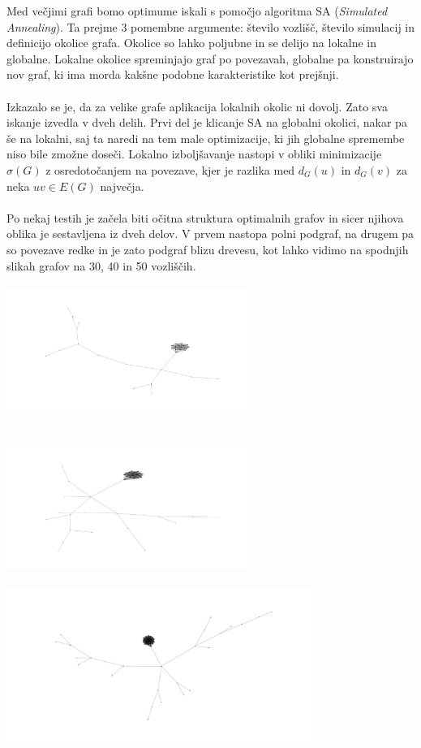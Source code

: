 \documentclass[ letterpaper, titlepage, fleqn]{article}
\begin{document}
Med večjimi grafi bomo optimume iskali s pomočjo algoritma SA ({\em Simulated Annealing}). 
Ta prejme 3 pomembne argumente: število vozlišč, število simulacij in definicijo okolice grafa.
Okolice so lahko poljubne in se delijo na lokalne in globalne.
Lokalne okolice spreminjajo graf po povezavah, globalne pa
konstruirajo nov graf, ki ima morda kakšne podobne karakteristike kot prejšnji.
\\\\
Izkazalo se je, da za velike grafe aplikacija lokalnih okolic ni dovolj. Zato
sva iskanje izvedla v dveh delih. Prvi del je klicanje SA na globalni okolici, nakar
pa še na lokalni, saj ta naredi na tem male optimizacije, ki jih globalne spremembe 
niso bile zmožne doseči.
Lokalno izboljšavanje nastopi v obliki minimizacije $\sigma(G)$ z osredotočanjem na
povezave, kjer je razlika med $d_G(u)$ in $d_G(v)$ za neka $uv \in E(G)$ največja.
\\\\
Po nekaj testih je začela biti očitna struktura optimalnih grafov in sicer
njihova oblika je sestavljena iz dveh delov. V prvem nastopa polni podgraf, 
na drugem pa so povezave redke in je zato podgraf blizu drevesu, kot lahko 
vidimo na spodnjih slikah grafov na 30, 40 in 50 vozliščih. \\
\includegraphics[width=8cm, height=5cm]{graphics/opt_sample_30.png}  
\includegraphics[width=8cm, height=5cm]{graphics/opt_sample_40.png}  \\
\includegraphics[width=\textwidth, height=5cm]{graphics/opt_sample_50.png} \\
\end{document}
